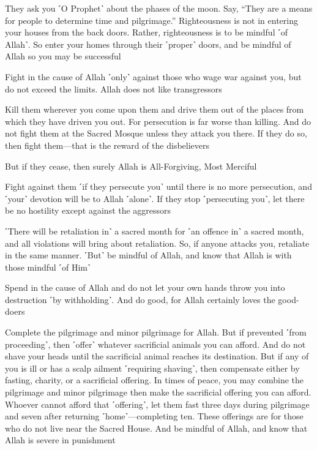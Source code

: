 They ask you ˹O Prophet˺ about the phases of the moon. Say, “They are a means for people to determine time and pilgrimage.” Righteousness is not in entering your houses from the back doors. Rather, righteousness is to be mindful ˹of Allah˺. So enter your homes through their ˹proper˺ doors, and be mindful of Allah so you may be successful

Fight in the cause of Allah ˹only˺ against those who wage war against you, but do not exceed the limits. Allah does not like transgressors

Kill them wherever you come upon them and drive them out of the places from which they have driven you out. For persecution is far worse than killing. And do not fight them at the Sacred Mosque unless they attack you there. If they do so, then fight them—that is the reward of the disbelievers

But if they cease, then surely Allah is All-Forgiving, Most Merciful

Fight against them ˹if they persecute you˺ until there is no more persecution, and ˹your˺ devotion will be to Allah ˹alone˺. If they stop ˹persecuting you˺, let there be no hostility except against the aggressors

˹There will be retaliation in˺ a sacred month for ˹an offence in˺ a sacred month, and all violations will bring about retaliation. So, if anyone attacks you, retaliate in the same manner. ˹But˺ be mindful of Allah, and know that Allah is with those mindful ˹of Him˺

Spend in the cause of Allah and do not let your own hands throw you into destruction ˹by withholding˺. And do good, for Allah certainly loves the good-doers

Complete the pilgrimage and minor pilgrimage for Allah. But if prevented ˹from proceeding˺, then ˹offer˺ whatever sacrificial animals you can afford. And do not shave your heads until the sacrificial animal reaches its destination. But if any of you is ill or has a scalp ailment ˹requiring shaving˺, then compensate either by fasting, charity, or a sacrificial offering. In times of peace, you may combine the pilgrimage and minor pilgrimage then make the sacrificial offering you can afford. Whoever cannot afford that ˹offering˺, let them fast three days during pilgrimage and seven after returning ˹home˺—completing ten. These offerings are for those who do not live near the Sacred House. And be mindful of Allah, and know that Allah is severe in punishment

